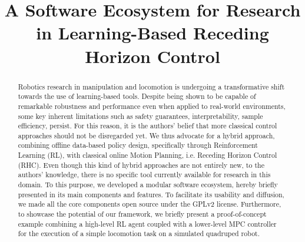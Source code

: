 \documentclass[letterpaper, 10 pt, conference]{ieeeconf}  %
\begin{document}
	
\title{\LARGE \bf
A Software Ecosystem for Research in Learning-Based Receding Horizon Control
}

\author{
}

\maketitle

\begingroup\renewcommand{}
\endgroup

\begingroup\renewcommand{}
\endgroup

\setlength{\textfloatsep}{12.0pt plus 8.0pt minus .0pt}

\begin{abstract}
Robotics research in manipulation and locomotion is undergoing a transformative shift towards the use of learning-based tools. Despite being shown to be capable of remarkable robustness and performance even when applied to real-world environments, some key inherent limitations such as safety guarantees, interpretability, sample efficiency, persist. For this reason, it is the authors' belief that more classical control approaches should not be disregarded yet. We thus advocate for a hybrid approach, combining offline data-based policy design, specifically through Reinforcement Learning (RL), with classical online Motion Planning, i.e. Receding Horizon Control (RHC). Even though this kind of hybrid approaches are not entirely new, to the authors' knowledge, there is no specific tool currently available for research in this domain. To this purpose, we developed a modular software ecosystem, hereby briefly presented in its main components and features. 
To facilitate its usability and diffusion, we made all the core components open source under the GPLv2 license. Furthermore, to showcase the potential of our framework, we briefly present a proof-of-concept example combining a high-level RL agent coupled with a lower-level MPC controller for the execution of a simple locomotion task on a simulated quadruped robot.
\end{abstract}

\IEEEpeerreviewmaketitle


%
%






\end{document}
